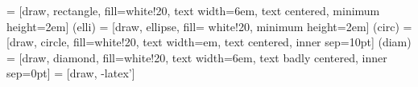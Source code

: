 \documentclass[a4paper,10pt,border=8pt]{report}
\begin{document}
 = [draw, rectangle, fill=white!20, text width=6em, text centered, minimum height=2em]
\tikzstyle(elli) = [draw, ellipse, fill= white!20, minimum height=2em]
\tikzstyle(circ) = [draw, circle, fill=white!20, text width=em, text centered, inner sep=10pt]
\tikzstyle(diam) = [draw, diamond, fill=white!20, text width=6em, text badly centered, inner sep=0pt]
 = [draw, -latex']
\begin{figure}
\begin{center}
\end{center}
\end{figure}
\end{document}

